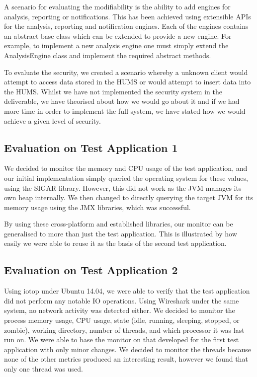 \documentclass[10pt,a4paper]{article}
\begin{document}
A scenario for evaluating the modifiability is the ability to add engines for analysis, reporting or notifications. This has been achieved using extensible APIs for the analysis, reporting and notification engines. Each of the engines contains an abstract base class which can be extended to provide a new engine. For example, to implement a new analysis engine one must simply extend the AnalysisEngine class and implement the required abstract methods.

To evaluate the security, we created a scenario whereby a unknown client would attempt to access data stored in the HUMS or would attempt to insert data into the HUMS. Whilst we have not implemented the security system in the deliverable, we have theorised about how we would go about it and if we had more time in order to implement the full system, we have stated how we would achieve a given level of security.

\subsection{Evaluation on Test Application 1}
\label{sec:test_app1}

We decided to monitor the memory and CPU usage of the test application, and our initial implementation simply queried the operating system for these values, using the SIGAR library. However, this did not work as the JVM manages its own heap internally. We then changed to directly querying the target JVM for its memory usage using the JMX libraries, which was successful.

By using these cross-platform and established libraries, our monitor can be generalised to more than just the test application. This is illustrated by how easily we were able to reuse it as the basis of the second test application.

\subsection{Evaluation on Test Application 2}
\label{sec:test_app2}

Using iotop under Ubuntu 14.04, we were able to verify that the test application did not perform any notable IO operations. Using Wireshark under the same system, no network activity was detected either.
We decided to monitor the process memory usage, CPU usage, state (idle, running, sleeping, stopped, or zombie), working directory, number of threads, and which processor it was last run on. We were able to base the monitor on that developed for the first test application with only minor changes. We decided to monitor the threads because none of the other metrics produced an interesting result, however we found that only one thread was used.
\end{document}
